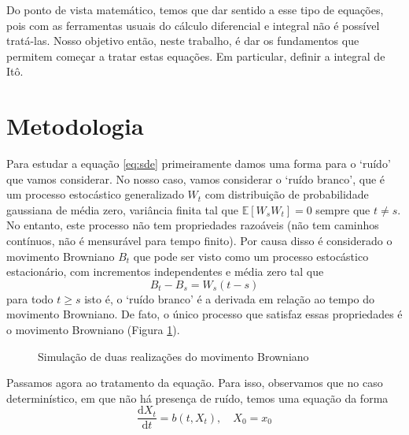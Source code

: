 \documentclass[12pt,a4paper]{article}
\theoremstyle{definition}
\begin{document}
Do ponto de vista matemático, temos que dar sentido a esse tipo de equações, pois com as ferramentas usuais do cálculo diferencial e integral não é possível tratá-las. Nosso objetivo então, neste trabalho, é dar os fundamentos que permitem começar a tratar estas equações. Em particular, definir a integral de Itô.


\section*{Metodologia}

Para estudar a equação \eqref{eq:sde} primeiramente damos uma forma para o `ruído' que vamos considerar. No nosso caso, vamos considerar o `ruído branco', que é um processo estocástico generalizado $W_t$ com distribuição de probabilidade gaussiana de média zero, variância finita tal que $\mathbb{E}[W_sW_t]=0$ sempre que $t\neq s$. No entanto, este processo não tem propriedades razoáveis (não tem caminhos contínuos, não é mensurável para tempo finito). Por causa disso é considerado o movimento Browniano $B_t$ que pode ser visto como um processo estocástico estacionário, com incrementos independentes e média zero tal que 
\[
B_t-B_s=W_s(t-s)
\]
para todo $t\geq s$ isto é, o `ruído branco' é a derivada em relação ao tempo do movimento Browniano. De fato, o único processo que satisfaz essas propriedades é o movimento Browniano (Figura \ref{fig:brownian_motion}). 

\begin{figure}[h!]
\centering
{}
\caption{Simulação de duas realizações do movimento Browniano \cite{texexchange:brownian-tikz}}
\label{fig:brownian_motion}
\end{figure}

Passamos agora ao tratamento da equação. Para isso, observamos que no caso determinístico, em que não há presença de ruído, temos uma equação da forma
\begin{equation}
	\frac{\mathrm{d} X_t}{\mathrm{d} t} = b(t, X_t), \quad X_0 = x_0
\end{equation}
\end{document}
